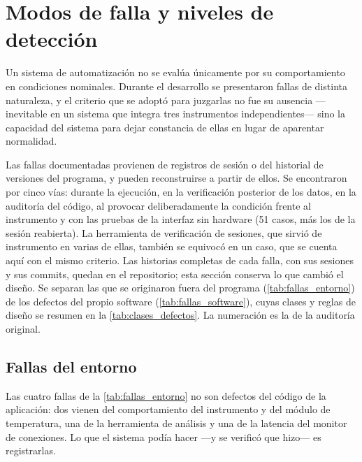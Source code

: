 \section{Modos de falla y niveles de detección}
\label{sec:fallas}

Un sistema de automatización no se evalúa únicamente por su
comportamiento en condiciones nominales. Durante el desarrollo se
presentaron fallas de distinta naturaleza, y el criterio que se adoptó
para juzgarlas no fue su ausencia ---inevitable en un sistema que
integra tres instrumentos independientes--- sino la capacidad del
sistema para dejar constancia de ellas en lugar de aparentar
normalidad.

Las fallas documentadas provienen de registros de sesión o del
historial de versiones del programa, y pueden reconstruirse a partir de
ellos. Se encontraron por cinco vías: durante la ejecución, en la
verificación posterior de los datos, en la auditoría del código, al
provocar deliberadamente la condición frente al instrumento y con las
pruebas de la interfaz sin hardware (51 casos, más los de la sesión
reabierta). La herramienta de verificación de sesiones, que sirvió de
instrumento en varias de ellas, también se equivocó en un caso, que se
cuenta aquí con el mismo criterio. Las historias completas de cada
falla, con sus sesiones y sus commits, quedan en el repositorio; esta
sección conserva lo que cambió el diseño. Se separan las que se
originaron fuera del programa (\cref{tab:fallas_entorno}) de los
defectos del propio software (\cref{tab:fallas_software}), cuyas
clases y reglas de diseño se resumen en la \cref{tab:clases_defectos}.
La numeración es la de la auditoría original.

\subsection{Fallas del entorno}
\label{sec:fallas_entorno}

Las cuatro fallas de la \cref{tab:fallas_entorno} no son defectos del
código de la aplicación: dos vienen del comportamiento del
instrumento y del módulo de temperatura, una de la herramienta de
análisis y una de la latencia del monitor de conexiones. Lo que el
sistema podía hacer ---y se verificó que hizo--- es registrarlas.


